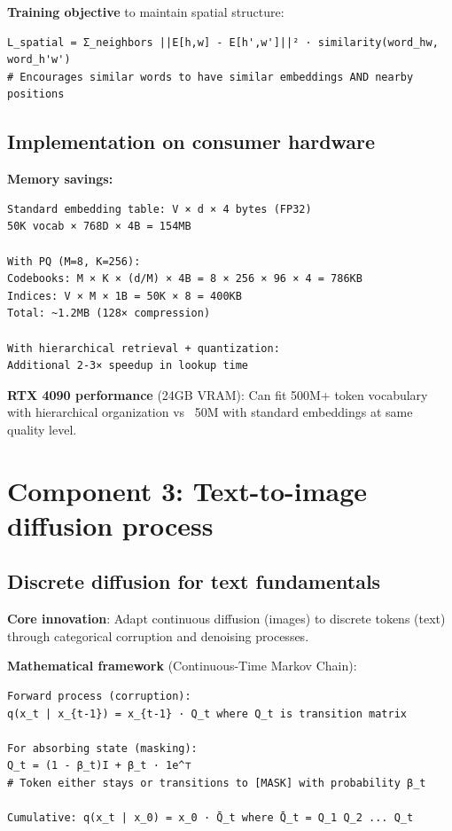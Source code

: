 \documentclass[11pt]{article}
\begin{document}
\textbf{Training objective} to maintain spatial structure:

\begin{verbatim}
L_spatial = Σ_neighbors ||E[h,w] - E[h',w']||² · similarity(word_hw, word_h'w')
# Encourages similar words to have similar embeddings AND nearby positions
\end{verbatim}

\subsection{Implementation on consumer hardware}

\textbf{Memory savings:}

\begin{verbatim}
Standard embedding table: V × d × 4 bytes (FP32)
50K vocab × 768D × 4B = 154MB

With PQ (M=8, K=256):
Codebooks: M × K × (d/M) × 4B = 8 × 256 × 96 × 4 = 786KB
Indices: V × M × 1B = 50K × 8 = 400KB
Total: ~1.2MB (128× compression)

With hierarchical retrieval + quantization:
Additional 2-3× speedup in lookup time
\end{verbatim}

\textbf{RTX 4090 performance} (24GB VRAM): Can fit 500M+ token vocabulary with hierarchical organization vs ~50M with standard embeddings at same quality level.

\section{Component 3: Text-to-image diffusion process}

\subsection{Discrete diffusion for text fundamentals}

\textbf{Core innovation}: Adapt continuous diffusion (images) to discrete tokens (text) through categorical corruption and denoising processes.

\textbf{Mathematical framework} (Continuous-Time Markov Chain):

\begin{verbatim}
Forward process (corruption):
q(x_t | x_{t-1}) = x_{t-1} · Q_t where Q_t is transition matrix

For absorbing state (masking):
Q_t = (1 - β_t)I + β_t · 1e^⊤
# Token either stays or transitions to [MASK] with probability β_t

Cumulative: q(x_t | x_0) = x_0 · Q̄_t where Q̄_t = Q_1 Q_2 ... Q_t
\end{verbatim}
\end{document}
